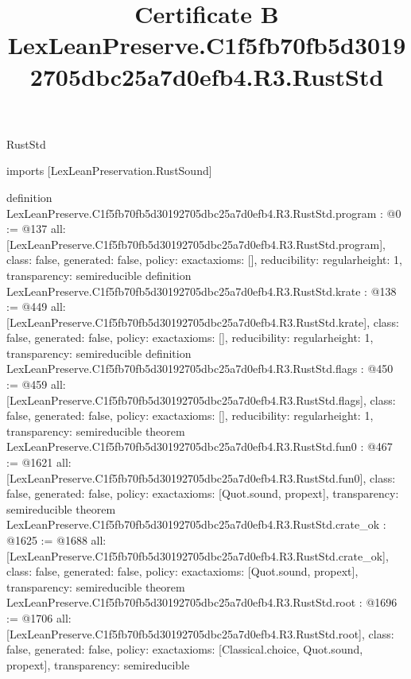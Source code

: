 \begin{lexlean}{RustStd}
\title{Certificate B LexLeanPreserve.C1f5fb70fb5d30192705dbc25a7d0efb4.R3.RustStd}
\begin{coremodule}
imports [LexLeanPreservation.RustSound]

definition LexLeanPreserve.C1f5fb70fb5d30192705dbc25a7d0efb4.R3.RustStd.program : @0 := @137 {
  all: [LexLeanPreserve.C1f5fb70fb5d30192705dbc25a7d0efb4.R3.RustStd.program],
  class: false,
  generated: false,
  policy: exact{axioms: []},
  reducibility: regular{height: 1},
  transparency: semireducible
}
definition LexLeanPreserve.C1f5fb70fb5d30192705dbc25a7d0efb4.R3.RustStd.krate : @138 := @449 {
  all: [LexLeanPreserve.C1f5fb70fb5d30192705dbc25a7d0efb4.R3.RustStd.krate],
  class: false,
  generated: false,
  policy: exact{axioms: []},
  reducibility: regular{height: 1},
  transparency: semireducible
}
definition LexLeanPreserve.C1f5fb70fb5d30192705dbc25a7d0efb4.R3.RustStd.flags : @450 := @459 {
  all: [LexLeanPreserve.C1f5fb70fb5d30192705dbc25a7d0efb4.R3.RustStd.flags],
  class: false,
  generated: false,
  policy: exact{axioms: []},
  reducibility: regular{height: 1},
  transparency: semireducible
}
theorem LexLeanPreserve.C1f5fb70fb5d30192705dbc25a7d0efb4.R3.RustStd.fun0 : @467 := @1621 {
  all: [LexLeanPreserve.C1f5fb70fb5d30192705dbc25a7d0efb4.R3.RustStd.fun0],
  class: false,
  generated: false,
  policy: exact{axioms: [Quot.sound, propext]},
  transparency: semireducible
}
theorem LexLeanPreserve.C1f5fb70fb5d30192705dbc25a7d0efb4.R3.RustStd.crate_ok : @1625 := @1688 {
  all: [LexLeanPreserve.C1f5fb70fb5d30192705dbc25a7d0efb4.R3.RustStd.crate_ok],
  class: false,
  generated: false,
  policy: exact{axioms: [Quot.sound, propext]},
  transparency: semireducible
}
theorem LexLeanPreserve.C1f5fb70fb5d30192705dbc25a7d0efb4.R3.RustStd.root : @1696 := @1706 {
  all: [LexLeanPreserve.C1f5fb70fb5d30192705dbc25a7d0efb4.R3.RustStd.root],
  class: false,
  generated: false,
  policy: exact{axioms: [Classical.choice, Quot.sound, propext]},
  transparency: semireducible
}


\end{coremodule}
\end{lexlean}
